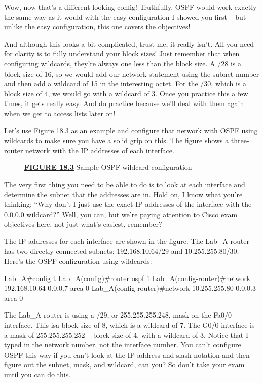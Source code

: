Wow, now that's a different looking config! Truthfully, OSPF would work
exactly the same way as it would with the easy configuration I showed
you first -- but unlike the easy configuration, this one covers the
objectives!

And although this looks a bit complicated, trust me, it really isn't.
All you need for clarity is to fully understand your block sizes! Just
remember that when configuring wildcards, they're always one less than
the block size. A /28 is a block size of 16, so we would add our network
statement using the subnet number and then add a wildcard of 15 in the
interesting octet. For the /30, which is a block size of 4, we would go
with a wildcard of 3. Once you practice this a few times, it gets really
easy. And do practice because we'll deal with them again when we get to
access lists later on!

Let's use \protect\hyperlink{c18.xhtmlux5cux23figure18-3}{Figure 18.3}
as an example and configure that network with OSPF using wildcards to
make sure you have a solid grip on this. The figure shows a three-router
network with the IP addresses of each interface.

\begin{figure}
\centering
\caption{{\protect\hyperlink{c18.xhtmlux5cux23figureanchor18-3}{\textbf{FIGURE
18.3}} Sample OSPF wildcard configuration}}
\end{figure}

The very first thing you need to be able to do is to look at each
interface and determine the subnet that the addresses are in. Hold on, I
know what you're thinking: ``Why don't I just use the exact IP addresses
of the interface with the 0.0.0.0 wildcard?'' Well, you can, but we're
paying attention to Cisco exam objectives here, not just what's easiest,
remember?

\protect\hypertarget{c18.xhtmlux5cux23Page_757}{}{}The IP addresses for
each interface are shown in the figure. The Lab\_A router has two
directly connected subnets: 192.168.10.64/29 and 10.255.255.80/30.
Here's the OSPF configuration using wildcards:

\begin{cli}
Lab_A#config t
Lab_A(config)#router ospf 1
Lab_A(config-router)#network 192.168.10.64 0.0.0.7 area 0
Lab_A(config-router)#network 10.255.255.80 0.0.0.3 area 0
\end{cli}

The Lab\_A router is using a /29, or 255.255.255.248, mask on the Fa0/0
interface. This isa block size of 8, which is a wildcard of 7. The G0/0
interface is a mask of 255.255.255.252 -- block size of 4, with a
wildcard of 3. Notice that I typed in the network number, not the
interface number. You can't configure OSPF this way if you can't look at
the IP address and slash notation and then figure out the subnet, mask,
and wildcard, can you? So don't take your exam until you can do this.

